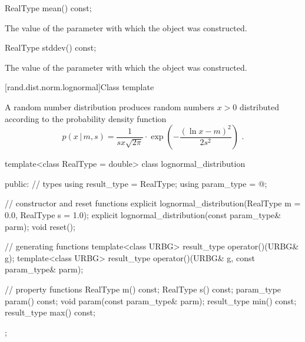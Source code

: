 %
\begin{itemdecl}
RealType mean() const;
\end{itemdecl}

\begin{itemdescr}
\pnum\returns The value of the  parameter
 with which the object was constructed.
\end{itemdescr}

%
\begin{itemdecl}
RealType stddev() const;
\end{itemdecl}

\begin{itemdescr}
\pnum\returns The value of the  parameter
 with which the object was constructed.
\end{itemdescr}


[rand.dist.norm.lognormal]{Class template }%
%
%

\pnum
A  random number distribution
produces random numbers $x > 0$
distributed according to
the probability density function%
%
%
\[ p(x\,|\,m,s) = \frac{1}{s x \sqrt{2 \pi}}
     \cdot \exp{\left(-\frac{(\ln{x} - m)^2}{2 s^2}\right)}
     \text{ .} \]

%
\begin{codeblock}
template<class RealType = double>
  class lognormal_distribution {
  public:
    // types
    using result_type = RealType;
    using param_type  = @\unspec@;

    // constructor and reset functions
    explicit lognormal_distribution(RealType m = 0.0, RealType s = 1.0);
    explicit lognormal_distribution(const param_type& parm);
    void reset();

    // generating functions
    template<class URBG>
      result_type operator()(URBG& g);
    template<class URBG>
      result_type operator()(URBG& g, const param_type& parm);

    // property functions
    RealType m() const;
    RealType s() const;
    param_type param() const;
    void param(const param_type& parm);
    result_type min() const;
    result_type max() const;
  };
\end{codeblock}


